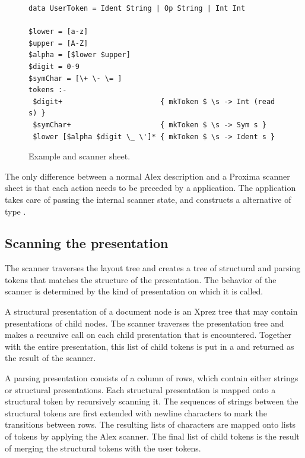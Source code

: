 \documentclass[12pt]{article}
\begin{document}
\begin{figure}
\begin{center}
\begin{footnotesize}
\begin{verbatim}
data UserToken = Ident String | Op String | Int Int

$lower = [a-z]
$upper = [A-Z]
$alpha = [$lower $upper]
$digit = 0-9		
$symChar = [\+ \- \= ]
tokens :-
 $digit+                       { mkToken $ \s -> Int (read s) }
 $symChar+                     { mkToken $ \s -> Sym s }
 $lower [$alpha $digit \_ \']* { mkToken $ \s -> Ident s }
\end{verbatim} %
\end{footnotesize}
\caption{Example  and scanner sheet.} \label{fig:scannerSheet} 
\end{center}
\end{figure}

The only difference between a normal Alex description and a Proxima scanner sheet is that each action needs to be preceded by a  application. The  application takes care of passing the internal scanner state, and constructs a  alternative of type . 



\subsection{Scanning the presentation}

The scanner traverses the layout tree and creates a tree of structural and parsing tokens that matches the structure of the presentation. The behavior of the scanner is determined by the kind of presentation on which it is called.



\noindent A structural presentation of a document node is an Xprez tree that may contain presentations of child nodes. The scanner traverses the presentation tree and makes a recursive call on each child presentation that is encountered. Together with the entire presentation, this list of child tokens is put in a  and returned as the result of the scanner.


\noindent A parsing presentation consists of a column of rows, which contain either strings or structural presentations. Each structural presentation is mapped onto a structural token by recursively scanning it. The sequences of strings between the structural tokens are first extended with newline characters to mark the transitions between rows. The resulting lists of characters are mapped onto lists of  tokens by applying the Alex scanner. The final list of child tokens is the result of merging the structural tokens with the user tokens.
\end{document}
